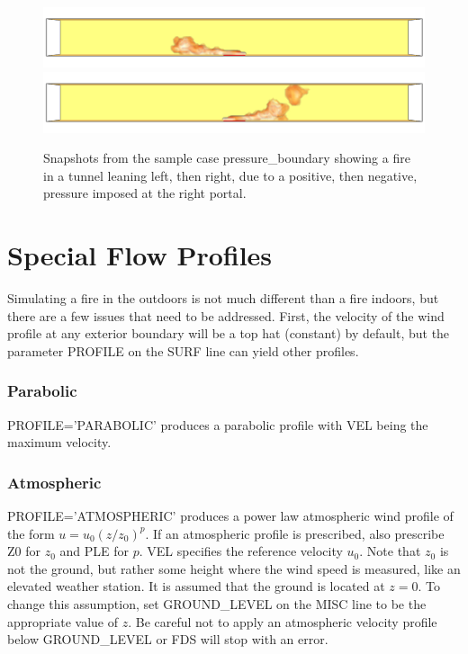 \documentclass[11pt]{book}
\begin{document}
\begin{figure}[ht]
\includegraphics[width=\textwidth]{SCRIPT_FIGURES/pressure_boundary_left}
\includegraphics[width=\textwidth]{SCRIPT_FIGURES/pressure_boundary_right}
\caption[Snapshots of the {\ct pressure\_boundary} test case]{Snapshots from the sample case {\ct pressure\_boundary}
showing a fire in a tunnel leaning left, then right, due to a positive, then negative, pressure imposed at
the right portal.}
\label{pressure_boundary}
\end{figure}


\clearpage

\section{Special Flow Profiles}
\label{info:profiles}

Simulating a fire in the outdoors is not much different than a fire indoors, but there are a few issues that need to be addressed. First, the velocity of the wind profile at any exterior boundary will be a top hat (constant) by default, but the parameter {\ct PROFILE} on the {\ct SURF} line can yield other profiles.

\subsubsection{Parabolic}

{\ct PROFILE='PARABOLIC'} produces a parabolic profile with {\ct VEL} being the maximum velocity.

\subsubsection{Atmospheric}

{\ct PROFILE='ATMOSPHERIC'} produces a power law atmospheric wind profile of the form $u=u_0 (z/z_0)^p$. If an atmospheric profile is prescribed, also prescribe {\ct Z0} for $z_0$  and {\ct PLE} for $p$. {\ct VEL} specifies the reference velocity $u_0$. Note that $z_0$ is not the ground, but rather some height where the wind speed is measured, like an elevated weather station. It is assumed that the ground is located at $z=0$. To change this assumption, set {\ct GROUND\_LEVEL} on the {\ct MISC} line to be the appropriate value of $z$. Be careful not to apply an atmospheric velocity profile below {\ct GROUND\_LEVEL} or FDS will stop with an error.
\end{document}
